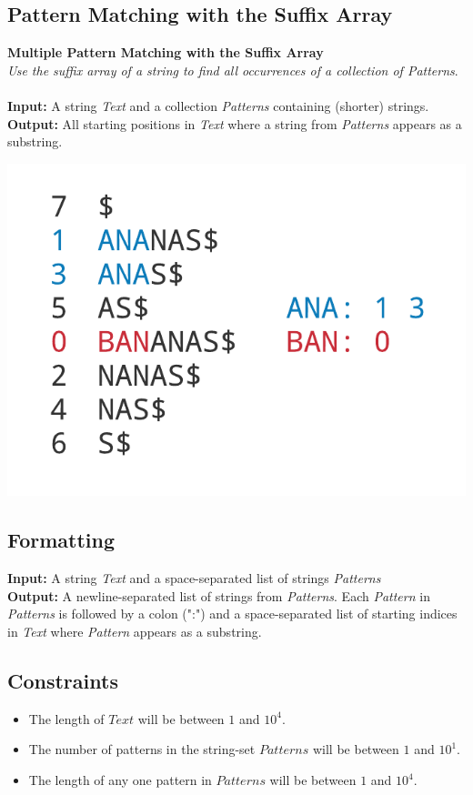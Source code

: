 \documentclass{article}
\begin{document}
\subsection{Pattern Matching with the Suffix Array}
\hline\vspace{5}
\textbf{Multiple Pattern Matching with the Suffix Array}\\
\emph{Use the suffix array of a string to find all occurrences of a collection of Patterns}.\\ \\
\textbf{Input:} A string \emph{Text} and a collection \emph{Patterns} containing (shorter) strings. \\
\textbf{Output:} All starting positions in \emph{Text} where a string from \emph{Patterns} appears as a substring.
\begin{center}
    \includegraphics[scale=0.2]{logos/9H.png} 
\end{center}
\hline\vspace{5}

\subsection*{Formatting}
\textbf{Input:} A string \emph{Text} and a space-separated list of strings \emph{Patterns}\\
\noindent\textbf{Output:} A newline-separated list of strings from \emph{Patterns}. Each \emph{Pattern} in \emph{Patterns} is followed by a colon (":") and a space-separated list of starting indices in \emph{Text} where \emph{Pattern} appears as a substring.

\subsection*{Constraints}
\begin{itemize}
    \item The length of $Text$ will be between $1$ and $10^4$.
    \item The number of patterns in the string-set $Patterns$ will be between $1$ and $10^1$.
    \item The length of any one pattern in $Patterns$ will be between $1$ and $10^4$.
\end{itemize}
\end{document}
